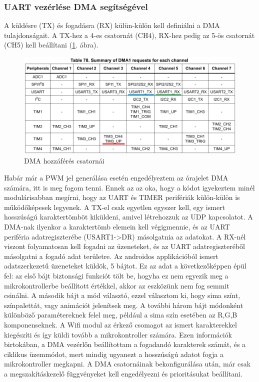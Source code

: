 \documentclass[../main.tex]{subfiles}
\begin{document}
        \subsubsection{UART vezérlése DMA segítségével}
            A küldésre (TX) és fogadásra (RX) külün-külön kell definiálni a DMA tulajdonságait. A TX-hez a 4-es csatornát (CH4), RX-hez pedig az 5-ös csatornát (CH5) kell beállítani (\ref{fig:dma_request}. ábra).
            \begin{figure}[h!]
                \centering
                    \includegraphics[width=12cm]{mbed_res/dma_requests}
                \caption{DMA hozzáférés csatornái \cite{rm0008}}
                \label{fig:dma_request}
            \end{figure}
            
            Habár már a PWM jel generálása esetén engedélyeztem az órajelet DMA számára, itt is meg fogom tenni. Ennek az az oka, hogy a kódot igyekeztem minél modulárisabban megírni, hogy az UART és TIMER perifériák külön-külön is működőképesek legyenek. A TX-el csak egyetlen egyszer kell, egy ismert hosszúságú karaktertömböt kiküldeni, amivel létrehozzuk az UDP kapcsolatot. A DMA-nak ilyenkor a karaktertömb elemein kell végigmennie, és az UART periféria adatregiszterébe (USART1->DR) másolgatnia az adatokat. A RX-nél viszont folyamatosan kell fogadni az üzeneteket, és az UART adatregiszteréből másolgatni a fogadó adat területre. Az androidos applikációból ismert adatszerkezetű üzeneteket küldök, 5 bájtot. Ez az adat a következőképpen épül fel: az első bájt biztonsági funkciót tölt be, hogyha ez nem egyezik meg a mikrokontrollerbe beállított értékkel, akkor az eszközünk nem fog semmit csinálni. A második bájt a mód választó, ezzel választom ki, hogy sima színt, színpalettát, vagy animációt jelenítsek meg. A további három bájt módonként különböző paramétereknek felel meg, például a sima szín esetében az R,G,B komponenseknek. A Wifi modul az érkező csomagot az ismert karakterekkel kiegészíti és így küldi tovább a mikrokontroller számára. Ezen információk birtokában, a DMA vezérlőn beállítottam a fogadandó karakterek számát, és a ciklikus üzemmódot, mert mindig ugyanezt a hosszúságú adatot fogja a mikrokontroller megkapni. A DMA csatornáinak bekonfigurálása után, már csak a megszakításkezelő függvényeket kell engedélyezni és prioritásukat beállítani.
            
\end{document}
